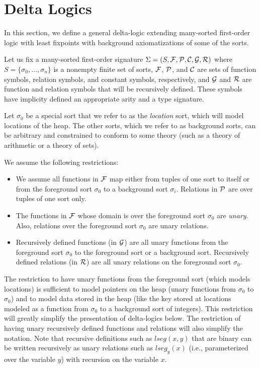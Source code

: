 \section{Delta Logics}
In this section, we define a general delta-logic extending many-sorted first-order logic with least fixpoints
with background axiomatizations of some of the sorts.

Let us fix a many-sorted first-order signature $\Sigma = (S, {\cal F}, {\cal P}, {\cal C}, {\cal G}, {\cal R})$ where 
$S=\{\sigma_0, \ldots, \sigma_n\}$ is a nonempty finite set of sorts, 
${\cal F}$, ${\cal P}$, and ${\cal C}$ are sets of function symbols, relation symbols,
and constant symbols, respectively, and
${\cal G}$ and ${\cal R}$ are function and relation symbols that will be recursively defined. 
These symbols have implicity defined an appropriate arity and a type signature.


Let $\sigma_0$ be a special sort that we refer to as the \emph{location} sort, which
will model locations of the heap. The other sorts, which we refer to as background sorts, can be arbitrary and
constrained to conform to some theory (such as a theory of arithmetic or a theory of sets).

We assume the following restrictions:
\begin{itemize}
	\item We assume all functions in ${\cal F}$ map either from tuples of one sort to itself or from the foreground
	 sort $\sigma_0$ to a background sort $\sigma_i$. Relations in ${\cal P}$ are over tuples of one sort only.
	\item The functions in ${\cal F}$ whose domain is over the foreground sort $\sigma_0$ are \emph{unary}.
	      Also, relations over the foreground sort $\sigma_0$ are unary relations.
	\item Recursively defined functions (in ${\cal G}$) are all unary functions from the foreground sort $\sigma_0$ 
	         to the foreground sort or a background sort. Recursively defined relations (in ${\cal R}$) are all unary relations on the foreground sort $\sigma_0$.
\end{itemize}

The restriction to have unary functions from the foreground sort (which models locations) is sufficient
to model pointers on the heap (unary functions from $\sigma_0$ to $\sigma_0$) 
and to model data stored in the heap (like the key stored at locations modeled as a function from $\sigma_0$ to a
background sort of integers).
This restriction will greatly simplify the presentation of delta-logics below.
The restriction of having unary recursively defined functions and relations will also simplify the notation.
Note that recursive definitions such as $\textit{lseg}(x,y)$ that are binary can be written recursively
as unary relations such as $\textit{lseg}_y(x)$ (i.e., parameterized over the variable $y$) with recursion
on the variable $x$. 


